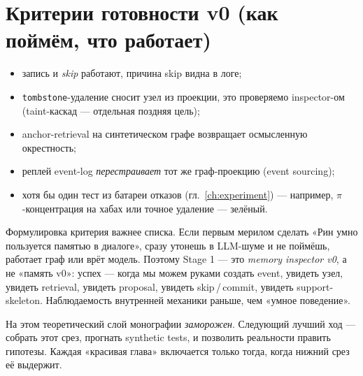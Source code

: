 \section{Критерии готовности v0 (как поймём, что работает)}

\begin{itemize}\itemsep1pt
\item запись и \emph{skip} работают, причина skip видна в логе;
\item \texttt{tombstone}-удаление сносит узел из проекции, это проверяемо inspector-ом
(taint-каскад — отдельная поздняя цель);
\item anchor-retrieval на синтетическом графе возвращает осмысленную окрестность;
\item реплей event-log \emph{перестраивает} тот же граф-проекцию (event sourcing);
\item хотя бы один тест из батареи отказов (гл.~\ref{ch:experiment}) — например,
$\pi$-концентрация на хабах или точное удаление — зелёный.
\end{itemize}

\begin{principle}
Формулировка критерия важнее списка. Если первым мерилом сделать «Рин умно пользуется
памятью в диалоге», сразу утонешь в LLM-шуме и не поймёшь, работает граф или врёт
модель. Поэтому Stage 1 — это \emph{memory inspector v0}, а не «память v0»: успех —
когда мы можем руками создать event, увидеть узел, увидеть retrieval, увидеть proposal,
увидеть skip\,/\,commit, увидеть support-skeleton. Наблюдаемость внутренней механики
раньше, чем «умное поведение».
\end{principle}

\begin{principle}
На этом теоретический слой монографии \emph{заморожен}. Следующий лучший ход —
собрать этот срез, прогнать synthetic tests, и позволить реальности править
гипотезы. Каждая «красивая глава» включается только тогда, когда нижний срез её
выдержит.
\end{principle}
